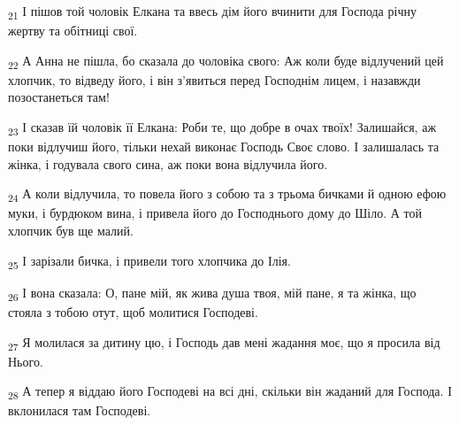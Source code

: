\begin{tcolorbox}
\textsubscript{21} І пішов той чоловік Елкана та ввесь дім його вчинити для Господа річну жертву та обітниці свої.
\end{tcolorbox}
\begin{tcolorbox}
\textsubscript{22} А Анна не пішла, бо сказала до чоловіка свого: Аж коли буде відлучений цей хлопчик, то відведу його, і він з'явиться перед Господнім лицем, і назавжди позостанеться там!
\end{tcolorbox}
\begin{tcolorbox}
\textsubscript{23} І сказав їй чоловік її Елкана: Роби те, що добре в очах твоїх! Залишайся, аж поки відлучиш його, тільки нехай виконає Господь Своє слово. І залишалась та жінка, і годувала свого сина, аж поки вона відлучила його.
\end{tcolorbox}
\begin{tcolorbox}
\textsubscript{24} А коли відлучила, то повела його з собою та з трьома бичками й одною ефою муки, і бурдюком вина, і привела його до Господнього дому до Шіло. А той хлопчик був ще малий.
\end{tcolorbox}
\begin{tcolorbox}
\textsubscript{25} І зарізали бичка, і привели того хлопчика до Ілія.
\end{tcolorbox}
\begin{tcolorbox}
\textsubscript{26} І вона сказала: О, пане мій, як жива душа твоя, мій пане, я та жінка, що стояла з тобою отут, щоб молитися Господеві.
\end{tcolorbox}
\begin{tcolorbox}
\textsubscript{27} Я молилася за дитину цю, і Господь дав мені жадання моє, що я просила від Нього.
\end{tcolorbox}
\begin{tcolorbox}
\textsubscript{28} А тепер я віддаю його Господеві на всі дні, скільки він жаданий для Господа. І вклонилася там Господеві.
\end{tcolorbox}
